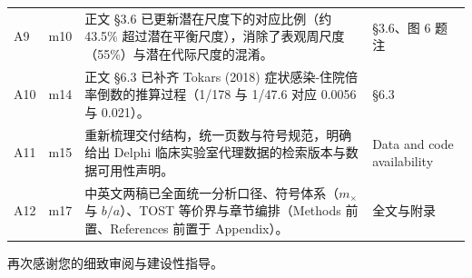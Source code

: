 \documentclass[UTF8,a4paper,11pt,fontset=none]{ctexart}
\begin{document}
{\begin{longtable}{@{}>{\raggedright\arraybackslash}p{1.0cm}>{\raggedright\arraybackslash}p{1.6cm}>{\raggedright\arraybackslash}p{8.6cm}>{\raggedright\arraybackslash}p{3.3cm}@{}}
\addlinespace[3pt]
A9 & m10 & 正文 §3.6 已更新潜在尺度下的对应比例（约 43.5\% 超过潜在平衡尺度），消除了表观周尺度（55\%）与潜在代际尺度的混淆。 & §3.6、图 6 题注 \\
\addlinespace[3pt]
A10 & m14 & 正文 §6.3 已补齐 Tokars (2018) 症状感染-住院倍率倒数的推算过程（1/178 与 1/47.6 对应 0.0056 与 0.021）。 & §6.3 \\
\addlinespace[3pt]
A11 & m15 & 重新梳理交付结构，统一页数与符号规范，明确给出 Delphi 临床实验室代理数据的检索版本与数据可用性声明。 & Data and code availability \\
\addlinespace[3pt]
A12 & m17 & 中英文两稿已全面统一分析口径、符号体系（$m_\times$ 与 $b/a$）、TOST 等价界与章节编排（Methods 前置、References 前置于 Appendix）。 & 全文与附录 \\
\bottomrule
\end{longtable}
}

再次感谢您的细致审阅与建设性指导。
\end{document}
